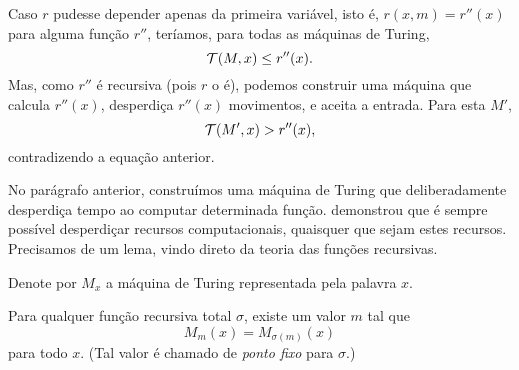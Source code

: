 Caso $r$ pudesse depender apenas da primeira variável,
isto é, $r(x, m) = r''(x)$ para alguma função $r''$,
teríamos, para todas as máquinas de Turing,
\begin{equation*}
    {\mathcal{T}}(M, x) \leq r''(x).
\end{equation*}
Mas, como $r''$ é recursiva
(pois $r$ o é),
podemos construir uma máquina que calcula $r''(x)$,
desperdiça $r''(x)$ movimentos,
e aceita a entrada.
Para esta $M'$,
\begin{equation*}
    {\mathcal{T}}(M', x) > r''(x),
\end{equation*}
contradizendo a equação anterior.

No parágrafo anterior,
construímos uma máquina de Turing
que deliberadamente desperdiça tempo
ao computar determinada função.
 demonstrou que
é sempre possível desperdiçar recursos computacionais,
quaisquer que sejam estes recursos.
Precisamos de um lema,
vindo direto da teoria das funções recursivas.

\begin{lemma}
    Denote por $M_x$ a máquina de Turing
    representada pela palavra $x$.

    Para qualquer função recursiva total $\sigma$,
    existe um valor $m$ tal que
    \begin{equation*}
        M_m(x) = M_{\sigma(m)}(x)
    \end{equation*}
    para todo $x$.
    (Tal valor é chamado de \emph{ponto fixo} para $\sigma$.)
    \label{teorema_recursao}
\end{lemma}

